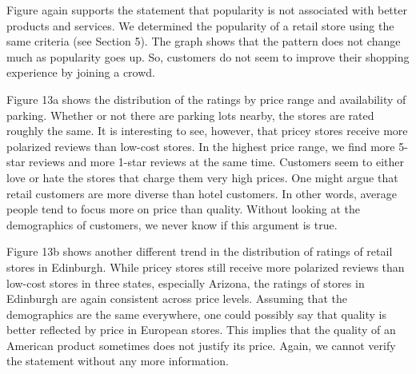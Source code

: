 \documentclass[11pt]{article}
\begin{document}
Figure again supports the statement that popularity is not associated with better products and services. We determined the popularity of a retail store using the same criteria (see Section 5). The graph shows that the pattern does not change much as popularity goes up. So, customers do not seem to improve their shopping experience by joining a crowd.

Figure 13a shows the distribution of the ratings by price range and availability of parking. Whether or not there are parking lots nearby, the stores are rated roughly the same. It is interesting to see, however, that pricey stores receive more polarized reviews than low-cost stores. In the highest price range, we find more 5-star reviews and more 1-star reviews at the same time. Customers seem to either love or hate the stores that charge them very high prices. One might argue that retail customers are more diverse than hotel customers. In other words, average people tend to focus more on price than quality. Without looking at the demographics of customers, we never know if this argument is true.

Figure 13b shows another different trend in the distribution of ratings of retail stores in Edinburgh. While pricey stores still receive more polarized reviews than low-cost stores in three states, especially Arizona, the ratings of stores in Edinburgh are again consistent across price levels. Assuming that the demographics are the same everywhere, one could possibly say that quality is better reflected by price in European stores. This implies that the quality of an American product sometimes does not justify its price. Again, we cannot verify the statement without any more information.
\end{document}
